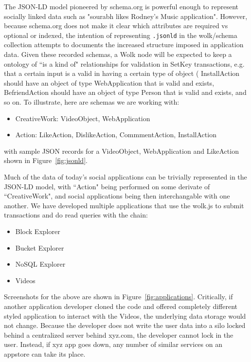\documentclass[journal]{IEEEtran}
\newcommand{\tx}[1]{\textsf{#1}}
\begin{document}
The JSON-LD model pioneered by schema.org is powerful enough to represent socially linked data such as "sourabh likes Rodney's Music application".  However, because schema.org does not make it clear which attributes are required vs optional or indexed, the intention of representing {\tt .jsonld} in the \tx{wolk/schema} collection attempts to documents the increased structure imposed in application data.   Given these recorded schemas, a Wolk node will be expected to keep a ontology of ``is a kind of" relationships for validation in SetKey transactions, e.g. that a certain input is a valid in having a certain type of \tx{object} ( \tx{InstallAction} should  have an \tx{object} of type \tx{WebApplication} that is valid and exists, \tx{BefriendAction} should have an \tx{object} of type \tx{Person} that is valid and exists, and so on.  To illustrate, here are schemas we are working with:
\begin{itemize}
    \item CreativeWork: VideoObject, WebApplication
    \item Action:  LikeAction, DislikeAction, CommmentAction, InstallAction
\end{itemize}
with sample JSON records for a \tx{VideoObject},  \tx{WebApplication} and \tx{LikeAction} shown in Figure~\ref{fig:jsonld}.


Much of the data of today's social applications can be trivially represented in the JSON-LD model, with ``Action" being performed on some derivate of ``CreativeWork", and social applications being then interchangable with one another.  We have developed multiple applications that use the wolk.js to submit transactions and do read queries with the chain:
\begin{itemize}
    \item Block Explorer
    \item Bucket Explorer
    \item NoSQL Explorer
    \item Videos
\end{itemize}
Screenshots for the above are shown in Figure~\ref{fig:applications}.  Critically, if another application developer cloned the code and offered completely different styled application to interact with the Videos, the underlying data storage would not change.  Because the developer does not write the user data into a silo locked behind a centralized server behind xyz.com, the developer cannot lock in the user.  Instead, if xyz app goes down, any number of similar services on an appstore can take its place.
\end{document}
